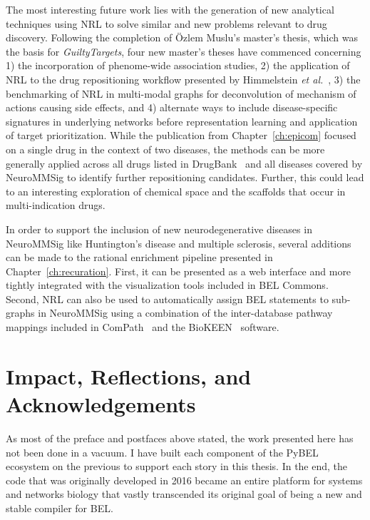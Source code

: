 The most interesting future work lies with the generation of new analytical techniques using \ac{NRL} to solve similar and new problems relevant to drug discovery.
Following the completion of \"{O}zlem Muslu's master's thesis, which was the basis for \textit{GuiltyTargets}, four new master's theses have commenced concerning 1) the incorporation of phenome-wide association studies, 2) the application of \ac{NRL} to the drug repositioning workflow presented by Himmelstein \textit{et al.}~\cite{Himmelstein2017}, 3) the benchmarking of \ac{NRL} in multi-modal graphs for deconvolution of mechanism of actions causing side effects, and 4) alternate ways to include disease-specific signatures in underlying networks before representation learning and application of target prioritization.
While the publication from Chapter~\ref{ch:epicom} focused on a single drug in the context of two diseases, the methods can be more generally applied across all drugs listed in DrugBank~\cite{Wishart2018} and all diseases covered by NeuroMMSig to identify further repositioning candidates.
Further, this could lead to an interesting exploration of chemical space and the scaffolds that occur in multi-indication drugs.

In order to support the inclusion of new neurodegenerative diseases in NeuroMMSig like Huntington's disease and multiple sclerosis, several additions can be made to the rational enrichment pipeline presented in Chapter~\ref{ch:recuration}.
First, it can be presented as a web interface and more tightly integrated with the visualization tools included in BEL Commons.
Second, \ac{NRL} can also be used to automatically assign \ac{BEL} statements to sub-graphs in NeuroMMSig using a combination of the inter-database pathway mappings included in ComPath~\cite{Domingo-Fernandez2018} and the BioKEEN~\cite{Ali2019} software.

\section{Impact, Reflections, and Acknowledgements}

As most of the preface and postfaces above stated, the work presented here has not been done in a vacuum.
I have built each component of the PyBEL ecosystem on the previous to support each story in this thesis.
In the end, the code that was originally developed in 2016 became an entire platform for systems and networks biology that vastly transcended its original goal of being a new and stable compiler for \ac{BEL}.

